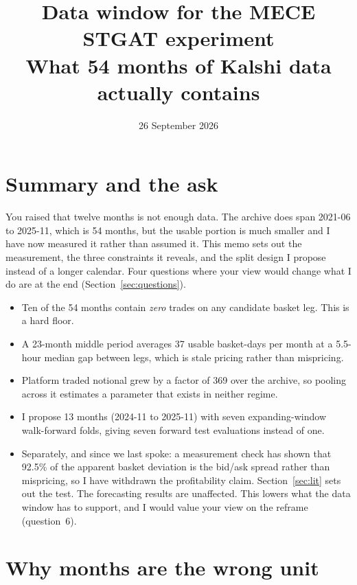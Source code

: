 \documentclass[11pt,a4paper]{article}
\title{\vspace{-1.6cm}\textbf{Data window for the MECE STGAT experiment}\\[2pt]
\large What 54 months of Kalshi data actually contains}
\author{}
\date{\vspace{-0.9cm}26 September 2026}
\begin{document}
\maketitle
\vspace{-1.2cm}

\section*{Summary and the ask}

You raised that twelve months is not enough data. The archive does span
2021-06 to 2025-11, which is 54 months, but the usable portion is much
smaller and I have now measured it rather than assumed it. This memo sets out
the measurement, the three constraints it reveals, and the split design I
propose instead of a longer calendar. Four questions where your view would
change what I do are at the end (Section~\ref{sec:questions}).

\begin{itemize}
  \item Ten of the 54 months contain \emph{zero} trades on any candidate
        basket leg. This is a hard floor.
  \item A 23-month middle period averages 37 usable basket-days per month at
        a 5.5-hour median gap between legs, which is stale pricing rather
        than mispricing.
  \item Platform traded notional grew by a factor of 369 over the archive, so
        pooling across it estimates a parameter that exists in neither
        regime.
  \item I propose 13 months (2024-11 to 2025-11) with seven expanding-window
        walk-forward folds, giving seven forward test evaluations instead of
        one.
  \item Separately, and since we last spoke: a measurement check has shown
        that 92.5\% of the apparent basket deviation is the bid/ask spread
        rather than mispricing, so I have withdrawn the profitability claim.
        Section~\ref{sec:lit} sets out the test. The forecasting results are
        unaffected. This lowers what the data window has to support, and I
        would value your view on the reframe (question~6).
\end{itemize}

\section{Why months are the wrong unit}
\end{document}
